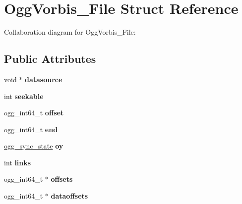 \hypertarget{struct_ogg_vorbis___file}{\section{Ogg\+Vorbis\+\_\+\+File Struct Reference}
\label{struct_ogg_vorbis___file}
}


Collaboration diagram for Ogg\+Vorbis\+\_\+\+File\+:
\subsection*{Public Attributes}
\begin{DoxyCompactItemize}
\item 
\hypertarget{struct_ogg_vorbis___file_a46afb3dcc7aac5917573e41d7504c0d6}{void $\ast$ {\bfseries datasource}}\label{struct_ogg_vorbis___file_a46afb3dcc7aac5917573e41d7504c0d6}

\item 
\hypertarget{struct_ogg_vorbis___file_a2a390c4f15c0d1fe0cf9c90fd0bae087}{int {\bfseries seekable}}\label{struct_ogg_vorbis___file_a2a390c4f15c0d1fe0cf9c90fd0bae087}

\item 
\hypertarget{struct_ogg_vorbis___file_a36f8f9f012cd2e7ab8cb395b787376cb}{ogg\+\_\+int64\+\_\+t {\bfseries offset}}\label{struct_ogg_vorbis___file_a36f8f9f012cd2e7ab8cb395b787376cb}

\item 
\hypertarget{struct_ogg_vorbis___file_ae56eb8bc78d2fc27c79d145a7c80a681}{ogg\+\_\+int64\+\_\+t {\bfseries end}}\label{struct_ogg_vorbis___file_ae56eb8bc78d2fc27c79d145a7c80a681}

\item 
\hypertarget{struct_ogg_vorbis___file_ae35fa1e6f99edcb104566301324ecf94}{\hyperlink{structogg__sync__state}{ogg\+\_\+sync\+\_\+state} {\bfseries oy}}\label{struct_ogg_vorbis___file_ae35fa1e6f99edcb104566301324ecf94}

\item 
\hypertarget{struct_ogg_vorbis___file_ad41f80ffaa6b48a14addef0a02639a87}{int {\bfseries links}}\label{struct_ogg_vorbis___file_ad41f80ffaa6b48a14addef0a02639a87}

\item 
\hypertarget{struct_ogg_vorbis___file_af9fe0ece4ff98e207682731b36951920}{ogg\+\_\+int64\+\_\+t $\ast$ {\bfseries offsets}}\label{struct_ogg_vorbis___file_af9fe0ece4ff98e207682731b36951920}

\item 
\hypertarget{struct_ogg_vorbis___file_af797824fb6e98c0248c19e6909dd680e}{ogg\+\_\+int64\+\_\+t $\ast$ {\bfseries dataoffsets}}\label{struct_ogg_vorbis___file_af797824fb6e98c0248c19e6909dd680e}


\end{DoxyCompactItemize}
